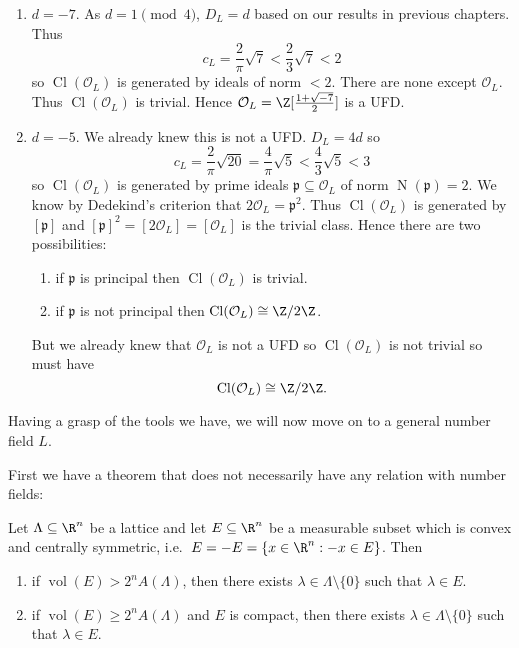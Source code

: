 \documentclass[a4paper]{article}
\renewcommand*{\O}{\mathcal{O}}
\DeclareMathOperator{\n}{N}
\DeclareMathOperator{\Cl}{Cl} %
\DeclareMathOperator{\vol}{vol}
\begin{document}
\begin{eg}\leavevmode
  \begin{enumerate}
  \item \(d = -7\). As \(d = 1 \pmod 4\), \(D_L = d\) based on our results in previous chapters. Thus
    \[
      c_L = \frac{2}{\pi} \sqrt 7 < \frac{2}{3} \sqrt 7 < 2
    \]
    so \(\Cl(\O_L)\) is generated by ideals of norm \(< 2\). There are none except \(\O_L\). Thus \(\Cl(\O_L)\) is trivial. Hence \(\O_L = \Z[\frac{1 + \sqrt{-7}}{2}]\) is a UFD.
  \item \(d = -5\). We already knew this is not a UFD. \(D_L = 4d\) so
    \[
      c_L = \frac{2}{\pi}\sqrt{20} = \frac{4}{\pi}\sqrt 5 < \frac{4}{3} \sqrt 5 < 3
    \]
    so \(\Cl(\O_L)\) is generated by prime ideals \(\mathfrak p \subseteq \O_L\) of norm \(\n(\mathfrak p) = 2\). We know by Dedekind's criterion that \(2\O_L = \mathfrak p^2\). Thus \(\Cl(\O_L)\) is generated by \([\mathfrak p]\) and \([\mathfrak p]^2 = [2\O_L] = [\O_L]\) is the trivial class. Hence there are two possibilities:
    \begin{enumerate}
    \item if \(\mathfrak p\) is principal then \(\Cl(\O_L)\) is trivial.
    \item if \(\mathfrak p\) is not principal then \(\Cl(\O_L) \cong \Z/2\Z\).
    \end{enumerate}
    But we already knew that \(\O_L\) is not a UFD so \(\Cl(\O_L)\) is not trivial so must have
    \[
      \Cl(\O_L) \cong \Z/2\Z.
    \]
  \end{enumerate}
\end{eg}

Having a grasp of the tools we have, we will now move on to a general number field \(L\).

First we have a theorem that does not necessarily have any relation with number fields:

\begin{theorem}[Minkowski]
  \label{thm:Minkowski}
  Let \(\Lambda \subseteq \R^n\) be a lattice and let \(E \subseteq \R^n\) be a measurable subset which is convex and centrally symmetric, i.e.\ \(E = -E = \{x \in \R^n: -x \in E\}\). Then
  \begin{enumerate}
  \item if \(\vol(E) > 2^n A(\Lambda)\), then there exists \(\lambda \in \Lambda \setminus \{0\}\) such that \(\lambda \in E\).
  \item if \(\vol(E) \geq 2^n A(\Lambda)\) and \(E\) is compact, then there exists \(\lambda \in \Lambda \setminus \{0\}\) such that \(\lambda \in E\).
  \end{enumerate}
\end{theorem}
\end{document}
